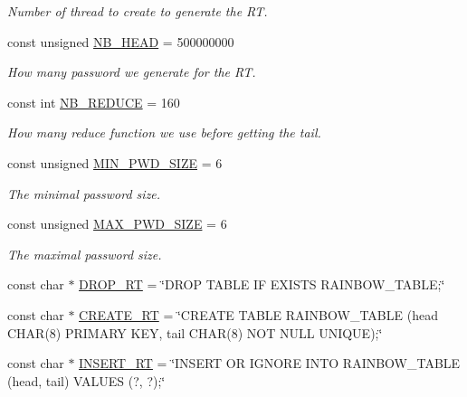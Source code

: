\begin{DoxyCompactItemize}
\begin{DoxyCompactList}\small\item\em Number of thread to create to generate the RT. \end{DoxyCompactList}\item 
const unsigned \hyperlink{namespacebe_1_1esi_1_1secl_1_1pn_a3f7aaccb1bf4e47f92d72bf9b2471328}{N\+B\+\_\+\+H\+E\+AD} = 500000000
\begin{DoxyCompactList}\small\item\em How many password we generate for the RT. \end{DoxyCompactList}\item 
const int \hyperlink{namespacebe_1_1esi_1_1secl_1_1pn_a9434f9e96778e243fcb677633df38598}{N\+B\+\_\+\+R\+E\+D\+U\+CE} = 160
\begin{DoxyCompactList}\small\item\em How many reduce function we use before getting the tail. \end{DoxyCompactList}\item 
const unsigned \hyperlink{namespacebe_1_1esi_1_1secl_1_1pn_ac4d6305d2a5baed196042f8a30533620}{M\+I\+N\+\_\+\+P\+W\+D\+\_\+\+S\+I\+ZE} = 6
\begin{DoxyCompactList}\small\item\em The minimal password size. \end{DoxyCompactList}\item 
const unsigned \hyperlink{namespacebe_1_1esi_1_1secl_1_1pn_a2e3241ac36dabdb668b68028e097dded}{M\+A\+X\+\_\+\+P\+W\+D\+\_\+\+S\+I\+ZE} = 6
\begin{DoxyCompactList}\small\item\em The maximal password size. \end{DoxyCompactList}\item 
const char $\ast$ \hyperlink{namespacebe_1_1esi_1_1secl_1_1pn_a6dae14cb83aa871e50c9aaea7f776055}{D\+R\+O\+P\+\_\+\+RT} = \char`\"{}D\+R\+OP T\+A\+B\+LE IF E\+X\+I\+S\+TS R\+A\+I\+N\+B\+O\+W\+\_\+\+T\+A\+B\+LE;\char`\"{}
\item 
const char $\ast$ \hyperlink{namespacebe_1_1esi_1_1secl_1_1pn_ab39f379fcf2d9342096df70dcf998d32}{C\+R\+E\+A\+T\+E\+\_\+\+RT} = \char`\"{}C\+R\+E\+A\+TE T\+A\+B\+LE R\+A\+I\+N\+B\+O\+W\+\_\+\+T\+A\+B\+LE (head C\+H\+AR(8) P\+R\+I\+M\+A\+RY K\+EY, tail C\+H\+AR(8) N\+OT N\+U\+LL U\+N\+I\+Q\+UE);\char`\"{}
\item 
const char $\ast$ \hyperlink{namespacebe_1_1esi_1_1secl_1_1pn_a93b0970fb08c37d478307bfadfb3b775}{I\+N\+S\+E\+R\+T\+\_\+\+RT} = \char`\"{}I\+N\+S\+E\+RT OR I\+G\+N\+O\+RE I\+N\+TO R\+A\+I\+N\+B\+O\+W\+\_\+\+T\+A\+B\+LE (head, tail) V\+A\+L\+U\+ES (?, ?);\char`\"{}
\end{DoxyCompactItemize}



